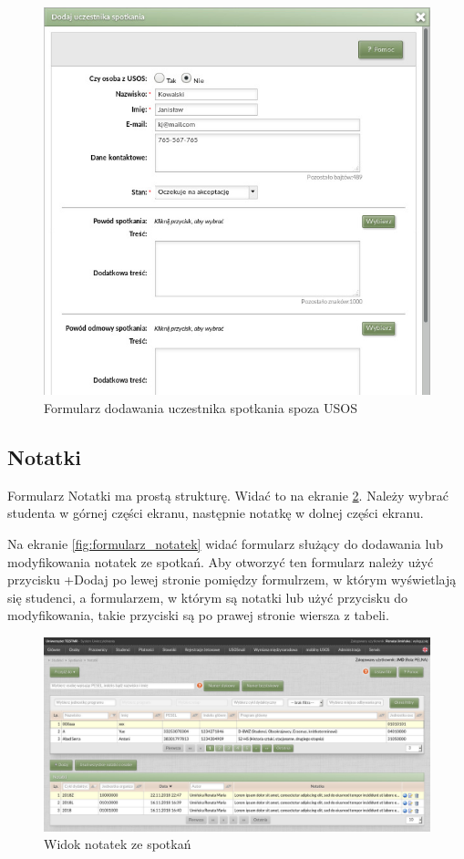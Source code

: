 \documentclass[licencjacka]{pracamgr}
\begin{document}
\begin{figure}[!]
  \includegraphics[width=\linewidth]{formularz_uczestnikow_nieUSOS.jpg}
  \caption{Formularz dodawania uczestnika spotkania spoza USOS}
  \label{fig:kalenformucznieusosadm}
\end{figure}

\subsection{Notatki}
Formularz Notatki ma prostą strukturę. Widać to na ekranie \ref{fig:notatki}. Należy wybrać studenta w górnej części ekranu, następnie notatkę w dolnej części ekranu.

Na ekranie \ref{fig:formularz_notatek} widać formularz służący do dodawania lub modyfikowania notatek ze spotkań. Aby otworzyć ten 
formularz należy użyć przycisku \textsf{+Dodaj} po lewej stronie pomiędzy formulrzem, w którym wyświetlają się studenci, a formularzem, w którym są 
notatki lub użyć przycisku do modyfikowania, takie przyciski są po prawej stronie wiersza z tabeli.

\begin{figure}[!]
  \includegraphics[width=\linewidth]{widok_notatek.jpg}
  \caption{Widok notatek ze spotkań}
  \label{fig:notatki}
\end{figure}
\end{document}
